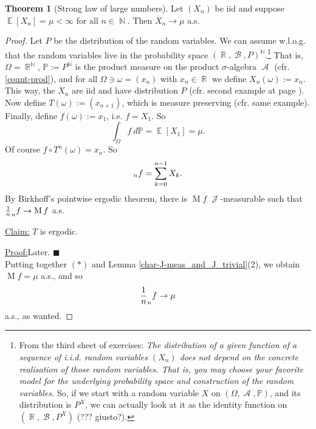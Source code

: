\documentclass[12pt,a4paper]{report}
\theoremstyle{definition}
\newtheorem{theorem}{Theorem}[chapter] %
\theoremstyle{num.custom-title}
\newenvironment{claim}[1]{\par\noindent\underline{Claim#1:}\space}{} %
\newenvironment{claimproof}[1]{\par\noindent\underline{Proof:}\space#1}{\leavevmode\unskip\penalty9999 \hbox{}\nobreak\hfill\quad\hbox{$\blacksquare$}} %
\DeclareMathOperator{\A}{\mathcal{A}}
\DeclareMathOperator{\B}{\mathcal{B}}
\DeclareMathOperator{\E}{\mathbb{E}}
\DeclareMathOperator{\J}{\mathcal{J}}
\DeclareMathOperator{\N}{\mathbb{N}}
\DeclareMathOperator{\R}{\mathbb{R}}
\let\S\relax %
\DeclareMathOperator{\S}{S}
\newcommand{\ol}{\overline}
\renewcommand{\1}{\mathbbm{1}}
\renewcommand{\P}{\mathbb{P}}
\begin{document}
\begin{theorem}[Strong law of large numbers]
Let $(X_n)$ be iid and suppose $\E[X_n] = \mu < \infty$ for all $n \in \N$. Then $\ol{X}_n \to \mu$ a.s.
\begin{proof}
Let $P$ be the distribution of the random variables. We can assume w.l.o.g. that the random variables live in the probability space $(\R,\B,P)^{\N}$.\footnote{From the third sheet of exercises: \emph{The distribution of a given function of a sequence of i.i.d. random variables $(X_n)$ does not depend on the concrete realisation of those random variables. That is, you may choose your favorite model for the underlying probability space and construction of the random variables.} So, if we start with a random variable $X$ on $(\Omega,\A,\P)$, and its distribution is $P^X$, we can actually look at it as the identity function on $(\R,\B,P^X)$ (??? giusto?).} That is, $\Omega = \R^{\N}$, $\P := P^{\N}$ is the product measure on the product $\sigma$-algebra $\A$ (cfr. \ref{count-prod}), and for all $\Omega \ni \omega = (x_n)$ with $x_n \in \R$ we define $X_n(\omega) := x_n$. This way, the $X_n$ are iid and have distribution $P$ (cfr. second example at page \pageref{constr-iid}).\\
Now define $T(\omega) := (x_{n+1})$, which is measure preserving (cfr. same example). Finally, define $f(\omega) := x_1$, i.e. $f = X_1$. So
\[
\int_\Omega f \ d\P = \E[X_1] = \mu. \tag{$*$}
\]
Of course $f \circ T^n(\omega) = x_n$. So
\[
\S_n f = \sum_{k=0}^{n-1} X_k.
\]
By Birkhoff's pointwise ergodic theorem, there is $\operatorname{M} f$ $\J$-measurable such that $\frac{1}{n} \S_n f \to \operatorname{M} f$ a.s.
\begin{claim}{}
$T$ is ergodic.
\begin{claimproof}
Later.
\end{claimproof}
\end{claim}\\
Putting together $(*)$ and Lemma \ref{char-J-meas_and_J_trivial}(2), we obtain $\operatorname{M} f = \mu$ a.s., and so 
\[
\frac{1}{n} \S_n f \to \mu
\]
a.s., as wanted.
\end{proof}
\end{theorem}
\end{document}
